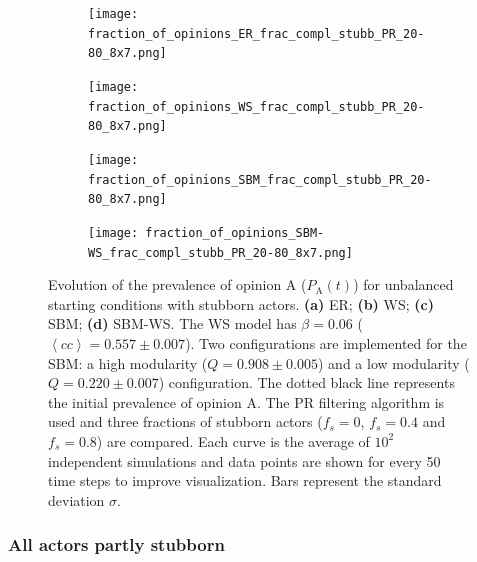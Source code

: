 \documentclass[11 pt , letterpaper , twoside , openright]{book}
\begin{document}
\begin{figure}[H]
  \begin{subfigure}[b]{0.49\textwidth}
    \caption{}
  	\texttt{[image: fraction\_of\_opinions\_ER\_frac\_compl\_stubb\_PR\_20-80\_8x7.png]}
  \end{subfigure}
  \begin{subfigure}[b]{0.49\textwidth}
    \caption{}
  	\texttt{[image: fraction\_of\_opinions\_WS\_frac\_compl\_stubb\_PR\_20-80\_8x7.png]}
  \end{subfigure}
  \begin{subfigure}[b]{0.49\textwidth}
    \caption{}
    \texttt{[image: fraction\_of\_opinions\_SBM\_frac\_compl\_stubb\_PR\_20-80\_8x7.png]}
  \end{subfigure}
  \begin{subfigure}[b]{0.49\textwidth}
    \caption{}
    \texttt{[image: fraction\_of\_opinions\_SBM-WS\_frac\_compl\_stubb\_PR\_20-80\_8x7.png]}
  \end{subfigure}
  \captionsetup{format=plain}
  \caption[Evolution of the prevalence of opinion A ($P_\text{A}(t)$) for unbalanced starting conditions with stubborn actors. The PR filtering algorithm is used and three fractions of stubborn actors ($f_s = 0$, $f_s = 0.4$ and $f_s = 0.8$) are compared.]{Evolution of the prevalence of opinion A ($P_\text{A}(t)$) for unbalanced starting conditions with stubborn actors. \textbf{(a)} ER; \textbf{(b)} WS; \textbf{(c)} SBM; \textbf{(d)} SBM-WS. The WS model has $\beta = 0.06$ ($\left<cc\right> = 0.557 \pm 0.007$). Two configurations are implemented for the SBM: a high modularity ($Q = 0.908 \pm 0.005$) and a low modularity ($Q = 0.220 \pm 0.007$) configuration. The dotted black line represents the initial prevalence of opinion A. The PR filtering algorithm is used and three fractions of stubborn actors ($f_s = 0$, $f_s = 0.4$ and $f_s = 0.8$) are compared. Each curve is the average of $10^2$ independent simulations and data points are shown for every 50 time steps to improve visualization. Bars represent the standard deviation $\sigma$.}
\label{ev_op_20_80_stubb_PR}
\end{figure}

\subsubsection{All actors partly stubborn}
\end{document}
